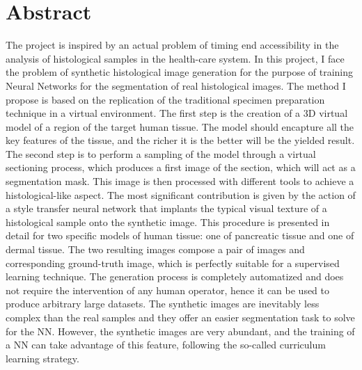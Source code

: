 \chapter*{Abstract}
The project is inspired by an actual problem of timing end accessibility in the analysis of histological samples in the health-care system. In this project, I face the problem of synthetic histological image generation for the purpose of training Neural Networks for the segmentation of real histological images. The method I propose is based on the replication of the traditional specimen preparation technique in a virtual environment. The first step is the creation of a 3D virtual model of a region of the target human tissue. The model should encapture all the key features of the tissue, and the richer it is the better will be the yielded result. The second step is to perform a sampling of the model through a virtual sectioning process, which produces a first image of the section, which will act as a segmentation mask. This image is then processed with different tools to achieve a histological-like aspect. The most significant contribution is given by the action of a style transfer neural network that implants the typical visual texture of a histological sample onto the synthetic image. This procedure is presented in detail for two specific models of human tissue: one of pancreatic tissue and one of dermal tissue. The two resulting images compose a pair of images and corresponding ground-truth image, which is perfectly suitable for a supervised learning technique. The generation process is completely automatized and does not require the intervention of any human operator, hence it can be used to produce arbitrary large datasets. The synthetic images are inevitably less complex than the real samples and they offer an easier segmentation task to solve for the NN. However, the synthetic images are very abundant, and the training of a NN can take advantage of this feature, following the so-called curriculum learning strategy.
